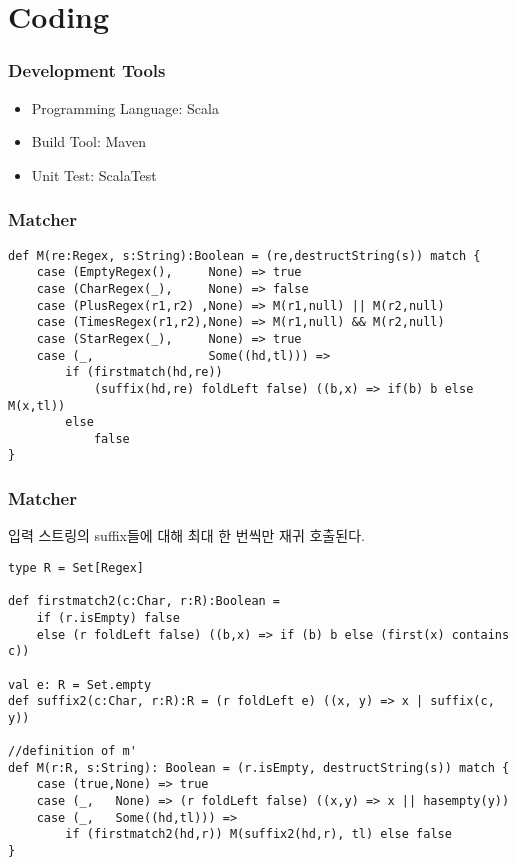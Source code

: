 \section{Coding}

\begin{frame}
    \frametitle{Development Tools}

    \begin{itemize}
        \item Programming Language: Scala
        \item Build Tool: Maven
        \item Unit Test: ScalaTest
    \end{itemize}
\end{frame}

\begin{frame}[fragile]
    \frametitle{Matcher \M}

    \small
    \begin{verbatim}
def M(re:Regex, s:String):Boolean = (re,destructString(s)) match {
    case (EmptyRegex(),     None) => true
    case (CharRegex(_),     None) => false
    case (PlusRegex(r1,r2) ,None) => M(r1,null) || M(r2,null)
    case (TimesRegex(r1,r2),None) => M(r1,null) && M(r2,null)
    case (StarRegex(_),     None) => true
    case (_,                Some((hd,tl))) => 
        if (firstmatch(hd,re)) 
            (suffix(hd,re) foldLeft false) ((b,x) => if(b) b else M(x,tl)) 
        else 
            false
}
    \end{verbatim}

\end{frame}

\begin{frame}[fragile]
    \frametitle{Matcher \MM}

     입력 스트링의 suffix들에 대해 최대 한 번씩만 재귀 호출된다. 

    \small
    \begin{verbatim}
type R = Set[Regex]

def firstmatch2(c:Char, r:R):Boolean =
    if (r.isEmpty) false
    else (r foldLeft false) ((b,x) => if (b) b else (first(x) contains c))

val e: R = Set.empty
def suffix2(c:Char, r:R):R = (r foldLeft e) ((x, y) => x | suffix(c, y))

//definition of m' 
def M(r:R, s:String): Boolean = (r.isEmpty, destructString(s)) match {
    case (true,None) => true
    case (_,   None) => (r foldLeft false) ((x,y) => x || hasempty(y))
    case (_,   Some((hd,tl))) => 
        if (firstmatch2(hd,r)) M(suffix2(hd,r), tl) else false
}
    \end{verbatim}

\end{frame}

